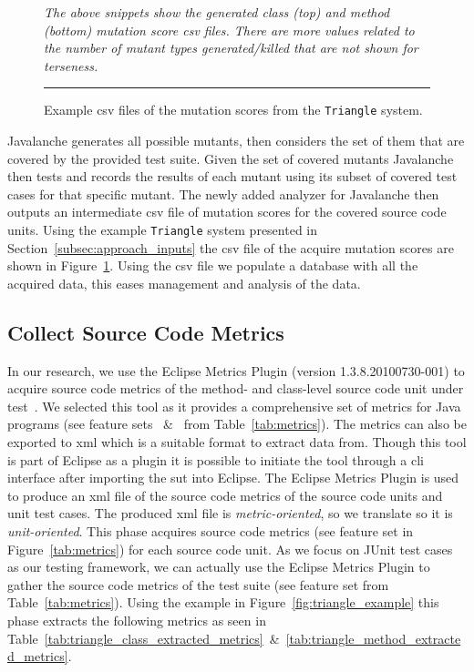 \begin{figure}[t]
  \centering
  
  
  \caption{Example \gls{csv} files of the mutation scores from the \texttt{Triangle} system.}
  \vspace{1mm}
  \footnotesize{\emph{The above snippets show the generated class (top) and method (bottom) mutation score \gls{csv} files. There are more values related to the number of mutant types generated/killed that are not shown for terseness.}}
  \vspace{2mm}
  \hrule
  \label{fig:triangle_mutation_scores}
\end{figure}

Javalanche generates all possible mutants, then considers the set of them that are covered by the provided test suite. Given the set of covered mutants Javalanche then tests and records the results of each mutant using its subset of covered test cases for that specific mutant. The newly added analyzer for Javalanche then outputs an intermediate \gls{csv} file of mutation scores for the covered source code units. Using the example \texttt{Triangle} system presented in Section~\ref{subsec:approach_inputs} the \gls{csv} file of the acquire mutation scores are shown in Figure~\ref{fig:triangle_mutation_scores}. Using the \gls{csv} file we populate a database with all the acquired data, this eases management and analysis of the data.


\subsection{Collect Source Code Metrics}
\label{subsec:approach_collect_source_metrics}
In our research, we use the Eclipse Metrics Plugin (version 1.3.8.20100730-001) to acquire source code metrics of the method- and class-level source code unit under test~\cite{Metrics}. We selected this tool as it provides a comprehensive set of metrics for Java programs (see feature sets ~\&~ from Table~\ref{tab:metrics}). The metrics can also be exported to \gls{xml} which is a suitable format to extract data from. Though this tool is part of Eclipse as a plugin it is possible to initiate the tool through a \gls{cli} interface after importing the \gls{sut} into Eclipse. The Eclipse Metrics Plugin is used to produce an \gls{xml} file of the source code metrics of the source code units and unit test cases. The produced \gls{xml} file is \emph{metric-oriented}, so we translate so it is \emph{unit-oriented}. This phase acquires source code metrics (see feature set  in Figure~\ref{tab:metrics}) for each source code unit. As we focus on JUnit test cases as our testing framework, we can actually use the Eclipse Metrics Plugin to gather the source code metrics of the test suite (see feature set  from Table~\ref{tab:metrics}). Using the example in Figure~\ref{fig:triangle_example} this phase extracts the following metrics as seen in Table~\ref{tab:triangle_class_extracted_metrics}~\&~\ref{tab:triangle_method_extracted_metrics}.

